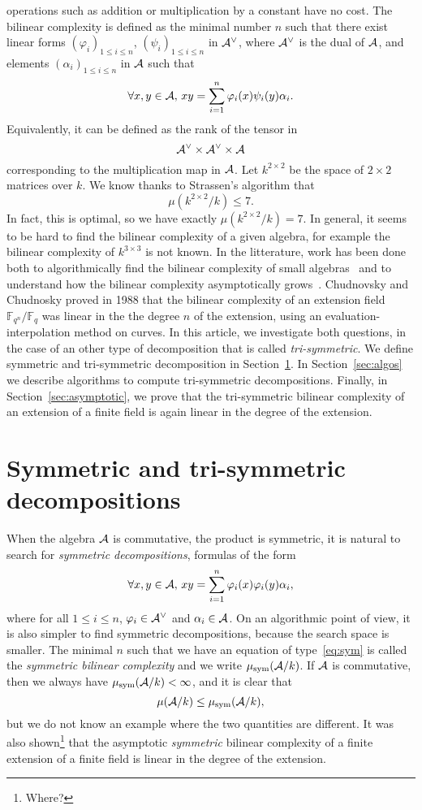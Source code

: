 \documentclass[a4paper,11pt]{article}
\begin{document}
operations such as addition or multiplication by a constant have no cost. The
bilinear complexity is defined as the minimal number $n$ such that there exist
linear forms $(\varphi_i)_{1\leq i \leq n}$, $(\psi_i)_{1\leq i \leq n}$ in
$\mathcal{A}^\vee$, where $\mathcal{A}^\vee$ is the dual of $\mathcal{A}$, and
elements $(\alpha_i)_{1\leq i \leq n}$ in $\mathcal{A}$ such that
\[
  \forall x, y\in\mathcal{A},\,xy = \sum_{i=1}^{n}\varphi_i(x)\psi_i(y)\alpha_i.
\]
Equivalently, it can be defined as the rank of the tensor in
\[
  \mathcal{A}^\vee \times \mathcal{A}^\vee\times \mathcal{A}
\]
corresponding to the multiplication map in $\mathcal{A}$. Let $k^{2\times2}$ be the space
of $2\times2$ matrices over $k$. We know thanks to Strassen's algorithm that 
\[
  \mu(k^{2\times 2}/k) \leq 7.
\]
In fact, this is optimal, so we have exactly $\mu(k^{2\times2}/k)=7$. In
general, it seems to be hard to find the bilinear complexity of a given algebra,
for example the bilinear complexity of $k^{3\times3}$ is not known.
In the litterature, work has been done both to algorithmically find the bilinear complexity of
small algebras~\cite{BDEZ12, Covanov18} and to understand how the bilinear
complexity asymptotically grows~\cite{CC88, BCPRRR}. Chudnovsky and Chudnosky
proved in 1988 that the bilinear complexity of an extension field
$\mathbb{F}_{q^n}/\mathbb{F}_{q}$ was linear in the the degree $n$ of the
extension, using an evaluation-interpolation method on curves. In this article, we
investigate both questions, in the case of an other type of decomposition that
is called \emph{tri-symmetric}. We define symmetric and tri-symmetric
decomposition in Section~\ref{sec:symtrisym}. In Section~\ref{sec:algos} we
describe algorithms to compute tri-symmetric decompositions. Finally, in
Section~\ref{sec:asymptotic}, we prove that the tri-symmetric bilinear
complexity of an extension of a finite field is again linear in the degree of the
extension.

\section{Symmetric and tri-symmetric decompositions}
\label{sec:symtrisym}

When the algebra $\mathcal{A}$ is commutative, \ie the product is symmetric, it is
natural to search for \emph{symmetric decompositions}, \ie formulas of the form
\begin{equation}
  \forall x, y\in\mathcal{A},\,xy = \sum_{i=1}^{n}\varphi_i(x)\varphi_i(y)\alpha_i,
  \label{eq:sym}
\end{equation}
where for all $1\leq i\leq n$, $\varphi_i\in\mathcal{A}^\vee$ and $\alpha_i\in\mathcal{A}$. On an
algorithmic point of view, it is also simpler to find symmetric decompositions,
because the search space is smaller. The minimal $n$ such that we have an
equation of type~\eqref{eq:sym} is called the \emph{symmetric bilinear
complexity} and we write $\mu_{\text{sym}}(\mathcal{A}/k)$. If $\mathcal{A}$ is commutative, then
we always have $\mu_{\text{sym}}(\mathcal{A}/k)<\infty$, and it is clear that 
\[
  \mu(\mathcal{A}/k)\leq\mu_{\text{sym}}(\mathcal{A}/k),
\]
but we do not know an example where the two quantities are different.
It was also shown\footnote{Where?} that the
asymptotic \emph{symmetric} bilinear complexity of a finite extension of a
finite field is linear in the degree of the extension.
\end{document}
